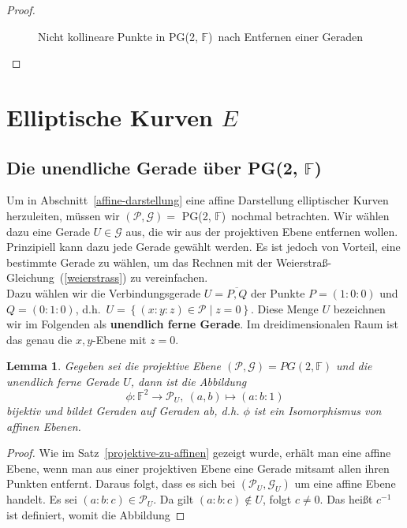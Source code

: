\documentclass[hidelinks]{article}
\theoremstyle{plain}
\newtheorem{lem}[thm]{Lemma}
\theoremstyle{definition}
\theoremstyle{rem}
\newcommand{\pgtwo}{PG(2, $\mathbb{F}$)\ }
\begin{document}
\begin{sloppypar}
\begin{proof}
\begin{enumerate}
\begin{figure}[H]
\begin{tikzpicture}[scale=1,domain=0:4]
   \end{tikzpicture}
 \caption{Nicht kollineare Punkte in \pgtwo nach Entfernen einer Geraden}
\end{figure}
\end{enumerate}
\vspace{-2em}
\end{proof}
\section{Elliptische Kurven $E$}
\subsection{Die unendliche Gerade über \pgtwo}
Um in Abschnitt~\ref{affine-darstellung} eine affine Darstellung elliptischer Kurven herzuleiten, müssen wir $(\mathcal{P,G}) =$ \pgtwo nochmal betrachten.
Wir wählen dazu eine Gerade $U \in \mathcal{G}$ aus, die wir aus der projektiven Ebene entfernen wollen. Prinzipiell kann dazu jede Gerade gewählt werden. 
Es ist jedoch von Vorteil, eine bestimmte Gerade zu wählen, um das Rechnen mit der Weierstraß-Gleichung~(\ref{weierstrass}) zu vereinfachen. \\
\newline
Dazu wählen wir die Verbindungsgerade $U = \overline{P,Q}$ der Punkte $P = (1:0:0)$ und $Q = (0:1:0)$, d.h.\ $U = \left\{ (x:y:z) \in \mathcal{P} \mid z = 0 \right\}$. 
Diese Menge $U$ bezeichnen wir im Folgenden als \textbf{unendlich ferne Gerade}.
Im dreidimensionalen Raum ist das genau die $x,y$-Ebene mit $z=0$.
\begin{lem}
    Gegeben sei die projektive Ebene $(\mathcal{P}, \mathcal{G}) = PG(2,\mathbb{F})$ und die unendlich ferne Gerade $U$, dann ist die Abbildung
    \begin{equation*}
        \phi: \mathbb{F}^2 \rightarrow \mathcal{P}_U,\ (a,b) \mapsto (a:b:1)
    \end{equation*}
    bijektiv und bildet Geraden auf Geraden ab, d.h. $\phi$ ist ein Isomorphismus von affinen Ebenen. 
\end{lem}
\begin{proof} \label{isomorphismus-lemma}
    Wie im Satz~\ref{projektive-zu-affinen} gezeigt wurde, erhält man eine affine Ebene, wenn man aus einer projektiven Ebene eine Gerade mitsamt allen ihren Punkten entfernt. Daraus folgt, dass es sich bei $(\mathcal{P}_U, \mathcal{G}_U)$ um eine affine Ebene handelt. Es sei $(a:b:c) \in \mathcal{P}_U$. Da gilt $(a:b:c) \notin U$, folgt $c \neq 0$. Das heißt $c^{-1}$ ist definiert, womit die Abbildung

\end{proof}
\end{sloppypar}
\end{document}
